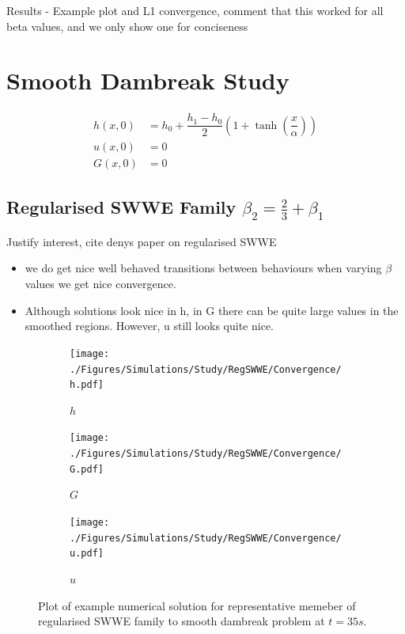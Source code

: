 \documentclass[10pt]{article}
\begin{document}

Results - Example plot and L1 convergence, comment that this worked for all beta values, and we only show one for conciseness


\section{Smooth Dambreak Study}
\begin{align}
h(x,0) & = h_0 + \dfrac{h_1 - h_0}{2} \left(1 + \tanh\left(\dfrac{x}{\alpha}\right)\right)  \\
u(x,0) &= 0 \\
G(x,0) &= 0
\end{align}


\subsection{Regularised SWWE Family $\beta_2 = \frac{2}{3} + \beta_1$}
Justify interest, cite denys paper on regularised SWWE

\begin{itemize}
	\item we do get nice well behaved transitions between behaviours when varying $\beta$ values
	we get nice convergence.
	\item Although solutions look nice in h, in G there can be quite large values in the smoothed regions. However, u still looks quite nice. 
\end{itemize}

\begin{figure}
	\centering
	\begin{subfigure}{0.32\textwidth}
		\centering
		\texttt{[image: ./Figures/Simulations/Study/RegSWWE/Convergence/h.pdf]}
		\caption{$h$}
	\end{subfigure}
	\begin{subfigure}{0.32\textwidth}
	\centering
	\texttt{[image: ./Figures/Simulations/Study/RegSWWE/Convergence/G.pdf]}
	\caption{$G$}
	\end{subfigure}
	\begin{subfigure}{0.32\textwidth}
	\centering
	\texttt{[image: ./Figures/Simulations/Study/RegSWWE/Convergence/u.pdf]}
	\caption{$u$}
	\end{subfigure}
	\caption{Plot of example numerical solution for representative memeber of regularised SWWE family to smooth dambreak problem at $t=35s$.}
\end{figure}
\end{document}
